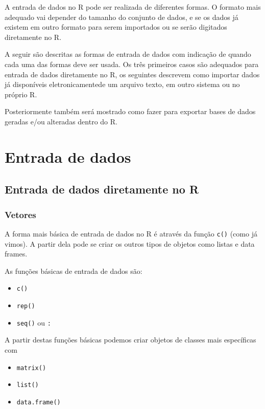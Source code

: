 \documentclass[10pt,a4paper]{book}
\providecommand{\tightlist}{%
  \setlength{\itemsep}{0pt}\setlength{\parskip}{0pt}}
\begin{document}
A entrada de dados no R pode ser realizada de diferentes formas. O
formato mais adequado vai depender do tamanho do conjunto de dados, e se
os dados já existem em outro formato para serem importados ou se serão
digitados diretamente no R.

A seguir são descritas as formas de entrada de dados com indicação de
quando cada uma das formas deve ser usada. Os três primeiros casos são
adequados para entrada de dados diretamente no R, os seguintes descrevem
como importar dados já disponíveis eletronicamentede um arquivo texto,
em outro sistema ou no próprio R.

Posteriormente também será mostrado como fazer para exportar bases de
dados geradas e/ou alteradas dentro do R.

\section{Entrada de dados}\label{entrada-de-dados}

\subsection{Entrada de dados diretamente no
R}\label{entrada-de-dados-diretamente-no-r}

\subsubsection{Vetores}\label{vetores}

A forma mais básica de entrada de dados no R é através da função
\texttt{c()} (como já vimos). A partir dela pode se criar os outros
tipos de objetos como listas e data frames.

As funções básicas de entrada de dados são:

\begin{itemize}
\tightlist
\item
  \texttt{c()}
\item
  \texttt{rep()}
\item
  \texttt{seq()} ou \texttt{:}
\end{itemize}

A partir destas funções básicas podemos criar objetos de classes mais
específicas com

\begin{itemize}
\tightlist
\item
  \texttt{matrix()}
\item
  \texttt{list()}
\item
  \texttt{data.frame()}
\end{itemize}
\end{document}
